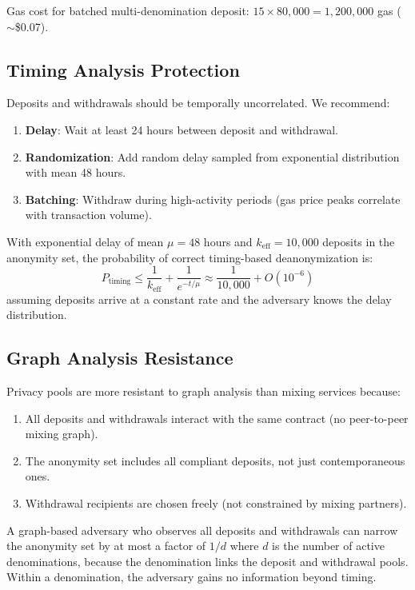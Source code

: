 Gas cost for batched multi-denomination deposit: $15 \times 80{,}000 = 1{,}200{,}000$ gas ($\sim$\$0.07).

\subsection{Timing Analysis Protection}

Deposits and withdrawals should be temporally uncorrelated. We recommend:

\begin{enumerate}
    \item \textbf{Delay}: Wait at least 24 hours between deposit and withdrawal.
    \item \textbf{Randomization}: Add random delay sampled from exponential distribution with mean 48 hours.
    \item \textbf{Batching}: Withdraw during high-activity periods (gas price peaks correlate with transaction volume).
\end{enumerate}

\begin{proposition}
With exponential delay of mean $\mu = 48$ hours and $k_{\text{eff}} = 10{,}000$ deposits in the anonymity set, the probability of correct timing-based deanonymization is:
\begin{equation}
    P_{\text{timing}} \leq \frac{1}{k_{\text{eff}}} + \frac{1}{e^{-t/\mu}} \approx \frac{1}{10{,}000} + O(10^{-6})
\end{equation}
assuming deposits arrive at a constant rate and the adversary knows the delay distribution.
\end{proposition}

\subsection{Graph Analysis Resistance}

Privacy pools are more resistant to graph analysis than mixing services because:

\begin{enumerate}
    \item All deposits and withdrawals interact with the same contract (no peer-to-peer mixing graph).
    \item The anonymity set includes all compliant deposits, not just contemporaneous ones.
    \item Withdrawal recipients are chosen freely (not constrained by mixing partners).
\end{enumerate}

\begin{theorem}
A graph-based adversary who observes all deposits and withdrawals can narrow the anonymity set by at most a factor of $1/d$ where $d$ is the number of active denominations, because the denomination links the deposit and withdrawal pools. Within a denomination, the adversary gains no information beyond timing.
\end{theorem}

